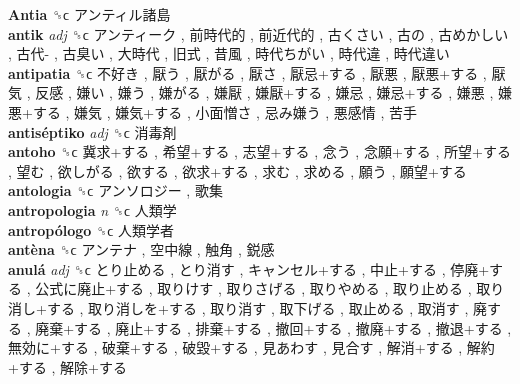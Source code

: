 \textbf{Antia} ␝ϲ   アンティル諸島   \\
\textbf{antik} \emph{adj}  ␝ϲ   アンティーク ,  前時代的 ,  前近代的 ,  古くさい ,  古の ,  古めかしい ,  古代- ,  古臭い ,  大時代 ,  旧式 ,  昔風 ,  時代ちがい ,  時代違 ,  時代違い   \\
\textbf{antipatia} ␝ϲ   不好き ,  厭う ,  厭がる ,  厭さ ,  厭忌+する ,  厭悪 ,  厭悪+する ,  厭気 ,  反感 ,  嫌い ,  嫌う ,  嫌がる ,  嫌厭 ,  嫌厭+する ,  嫌忌 ,  嫌忌+する ,  嫌悪 ,  嫌悪+する ,  嫌気 ,  嫌気+する ,  小面憎さ ,  忌み嫌う ,  悪感情 ,  苦手   \\
\textbf{antiséptiko} \emph{adj}  ␝ϲ   消毒剤   \\
\textbf{antoho} ␝ϲ   冀求+する ,  希望+する ,  志望+する ,  念う ,  念願+する ,  所望+する ,  望む ,  欲しがる ,  欲する ,  欲求+する ,  求む ,  求める ,  願う ,  願望+する   \\
\textbf{antologia} ␝ϲ   アンソロジー ,  歌集   \\
\textbf{antropologia} \emph{n}  ␝ϲ   人類学   \\
\textbf{antropólogo} ␝ϲ   人類学者   \\
\textbf{antèna} ␝ϲ   アンテナ ,  空中線 ,  触角 ,  鋭感   \\
\textbf{anulá} \emph{adj}  ␝ϲ   とり止める ,  とり消す ,  キャンセル+する ,  中止+する ,  停廃+する ,  公式に廃止+する ,  取りけす ,  取りさげる ,  取りやめる ,  取り止める ,  取り消し+する ,  取り消しを+する ,  取り消す ,  取下げる ,  取止める ,  取消す ,  廃する ,  廃棄+する ,  廃止+する ,  排棄+する ,  撤回+する ,  撤廃+する ,  撤退+する ,  無効に+する ,  破棄+する ,  破毀+する ,  見あわす ,  見合す ,  解消+する ,  解約+する ,  解除+する   \\
